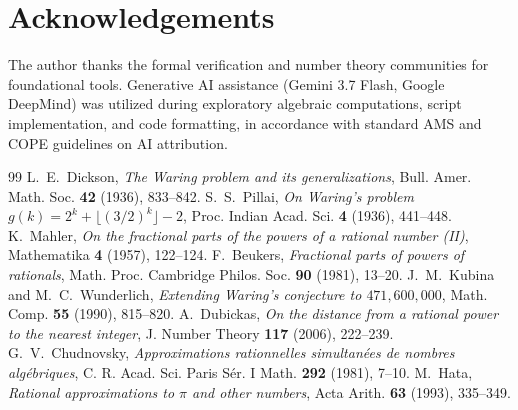 \documentclass[11pt,reqno]{article}
\theoremstyle{plain}
\theoremstyle{definition}
\numberwithin{equation}{section}
\begin{document}
\section*{Acknowledgements}
The author thanks the formal verification and number theory communities for foundational tools. Generative AI assistance (Gemini 3.7 Flash, Google DeepMind) was utilized during exploratory algebraic computations, script implementation, and code formatting, in accordance with standard AMS and COPE guidelines on AI attribution.

\begin{thebibliography}{99}
 L.~E.~Dickson, \emph{The Waring problem and its generalizations}, Bull. Amer. Math. Soc. \textbf{42} (1936), 833--842.
 S.~S.~Pillai, \emph{On Waring's problem $g(k) = 2^k + \lfloor(3/2)^k\rfloor - 2$}, Proc. Indian Acad. Sci. \textbf{4} (1936), 441--448.
 K.~Mahler, \emph{On the fractional parts of the powers of a rational number (II)}, Mathematika \textbf{4} (1957), 122--124.
 F.~Beukers, \emph{Fractional parts of powers of rationals}, Math. Proc. Cambridge Philos. Soc. \textbf{90} (1981), 13--20.
 J.~M.~Kubina and M.~C.~Wunderlich, \emph{Extending Waring's conjecture to $471{,}600{,}000$}, Math. Comp. \textbf{55} (1990), 815--820.
 A.~Dubickas, \emph{On the distance from a rational power to the nearest integer}, J. Number Theory \textbf{117} (2006), 222--239.
 G.~V.~Chudnovsky, \emph{Approximations rationnelles simultan\'ees de nombres alg\'ebriques}, C. R. Acad. Sci. Paris S\'er. I Math. \textbf{292} (1981), 7--10.
 M.~Hata, \emph{Rational approximations to $\pi$ and other numbers}, Acta Arith. \textbf{63} (1993), 335--349.
\end{thebibliography}
\end{document}
